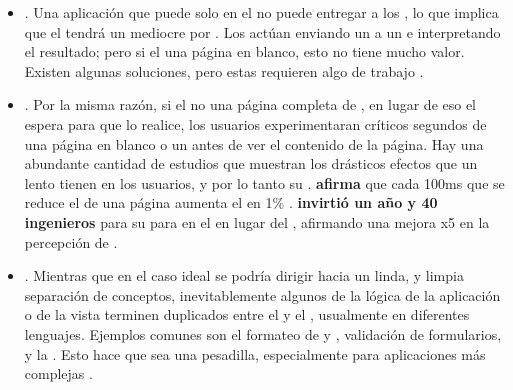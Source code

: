 \begin{itemize}
	\item
		\textbf{\seoINT}. Una aplicación que puede solo \runCPT en el \clientSideAS no puede entregar \htmlNAME a los \crawlersINT, lo que implica que el \webINT tendrá un \seoINT mediocre por . Los \crawlersINT actúan enviando un \requestINT a un \webserverINT e interpretando el resultado; pero si el \serverAS \responseINT una página en blanco, esto no tiene mucho valor. Existen algunas soluciones, pero estas requieren algo de trabajo \cite{online_problems_sing_page_app}.
	\item
		\textbf{\performanceQA}. Por la misma razón, si el \serverAS no \renderCPT una página completa de \htmlNAME, en lugar de eso el \clientSideAS espera para que \javaScriptNAME lo realice, los usuarios experimentaran críticos segundos de una página en blanco o un \loadingSpinnerCPT antes de ver el contenido de la página. Hay una abundante cantidad de estudios que muestran los drásticos efectos que un \siteINT lento tienen en los usuarios, y por lo tanto su \revenueQA \cite{online_fastView_web_perfor_opti_accele}. \textbf{\amazonNAME afirma} que cada 100ms que se reduce el \loadTimeCPT de una página aumenta el \revenueQA en 1\% \cite{kohavi2007online} \cite{online_psychology_web_performance}.\textbf{ \twitterNAME invirtió un año y 40 ingenieros} para \rebuildingPL su \siteINT para \renderCPT en el \serverAS en lugar del \clientAS, afirmando una mejora x5 en la percepción de \loadingTimeCPT \cite{online_improving_web_performance_twitter}.
	\item
		\textbf{\maintainabilityQA}. Mientras que en el caso ideal se podría dirigir hacia un linda, y limpia separación de conceptos, inevitablemente algunos \bitsPC de la lógica de la aplicación o de la vista terminen duplicados entre el \clientAS y el \serverAS, usualmente en diferentes lenguajes. Ejemplos comunes son el formateo de  \datePL y \currencyCPT, validación de formularios, y la \routingLogicAS. Esto hace que \maintenanceQA sea una pesadilla, especialmente para aplicaciones más complejas \cite{online_problems_sing_page_app}.

\end{itemize}
